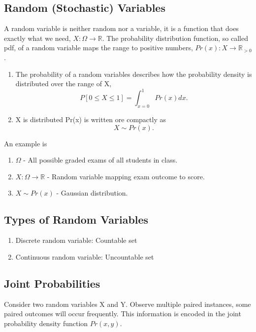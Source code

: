 \documentclass[12pt]{article}
\numberwithin{equation}{section}
\begin{document}
\subsection{Random (Stochastic) Variables}
A random variable is neither random nor a variable, it is a function that does exactly what we need, $X: \Omega \to \mathbb{R}$.
The probability distribution function, so called pdf, of a random variable maps the range to positive numbers, $Pr(x): X \to \mathbb{R}_{>0}$.
\begin{enumerate}
    \item The probability of a random variables describes how the probability density is distributed over the range of X,
    \begin{equation}
        P[0 \leq X \leq 1] = \int_{x = 0}^1 Pr(x) dx.
    \end{equation}
    \item X is distributed Pr(x) is written ore compactly as 
    \begin{equation}
        X \sim Pr(x).
    \end{equation}
\end{enumerate}
An example is 
\begin{enumerate}
\item $\Omega$ - All possible graded exams of all students in class.
\item $X: \Omega \to \mathbb{R}$ - Random variable mapping exam outcome to score.
\item $X \sim Pr(x)$ - Gaussian distribution.
\end{enumerate}


\subsection{Types of Random Variables}
\begin{enumerate}
    \item Discrete random variable: Countable set
    \item Continuous random variable: Uncountable set
\end{enumerate}

\subsection{Joint Probabilities}
Consider two random variables X and Y. Observe multiple paired instances, some paired outcomes will occur frequently. This information is encoded in the joint probability density function $Pr(x,y)$.
\end{document}
